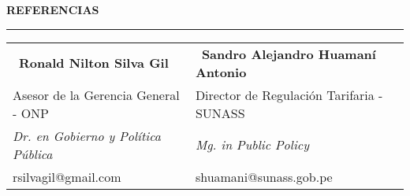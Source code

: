 \documentclass{resume}
\begin{document}
{\color{vino} \noindent\MakeUppercase{\large \bf Referencias} \\
\rule[3mm]{\textwidth}{0.5mm}}

\vspace{-3mm}

\begin{table}[H]
	\begin{tabular}{ll}
		{\color{vino}\faUser} \, {\bf Ronald Nilton Silva Gil} & {\color{vino}\faUser} \, {\bf Sandro Alejandro Huamaní Antonio} \\
		{Asesor de la Gerencia General - ONP} & {Director de Regulación Tarifaria - SUNASS} \\
		{\it Dr. en Gobierno y Política Pública} & {\it Mg. in Public Policy} \\
		{rsilvagil@gmail.com} & {shuamani@sunass.gob.pe}
	\end{tabular}
\end{table}

\begin{multicols}{2}
	
	
	
\end{multicols}
\end{document}
